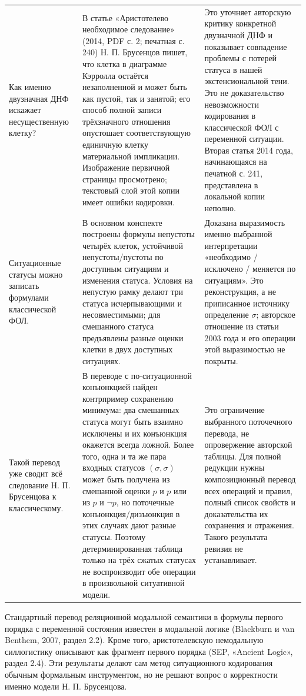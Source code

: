 \documentclass[12pt,a4paper]{article}
\begin{document}
\begin{longtable}{P{0.22\textwidth}P{0.36\textwidth}P{0.30\textwidth}}
Как именно двузначная ДНФ искажает несущественную клетку? & В статье «Аристотелево необходимое следование» (2014, PDF с. 2; печатная с. 240) Н. П. Брусенцов пишет, что клетка в диаграмме Кэрролла остаётся незаполненной и может быть как пустой, так и занятой; его способ полной записи трёхзначного отношения опустошает соответствующую единичную клетку материальной импликации. Изображение первичной страницы просмотрено; текстовый слой этой копии имеет ошибки кодировки. & Это уточняет авторскую критику конкретной двузначной ДНФ и показывает совпадение проблемы с потерей статуса в нашей экстенсиональной тени. Это не доказательство невозможности кодирования в классической ФОЛ с переменной ситуации. Вторая статья 2014 года, начинающаяся на печатной с. 241, представлена в локальной копии неполно. \\
Ситуационные статусы можно записать формулами классической ФОЛ. & В основном конспекте построены формулы непустоты четырёх клеток, устойчивой непустоты/пустоты по доступным ситуациям и изменения статуса. Условия на непустую рамку делают три статуса исчерпывающими и несовместимыми; для смешанного статуса предъявлены разные оценки клетки в двух доступных ситуациях. & Доказана выразимость именно выбранной интерпретации «необходимо / исключено / меняется по ситуациям». Это реконструкция, а не приписанное источнику определение \(\sigma\); авторское отношение из статьи 2003 года и его операции этой выразимостью не покрыты. \\
Такой перевод уже сводит всё следование Н. П. Брусенцова к классическому. & В переводе с по-ситуационной конъюнкцией найден контрпример сохранению минимума: два смешанных статуса могут быть взаимно исключены и их конъюнкция окажется всегда ложной. Более того, одна и та же пара входных статусов \((\sigma,\sigma)\) может быть получена из смешанной оценки \(p\) и \(p\) или из \(p\) и \(\neg p\), но поточечные конъюнкция/дизъюнкция в этих случаях дают разные статусы. Поэтому детерминированная таблица только на трёх сжатых статусах не воспроизводит обе операции в произвольной ситуативной модели. & Это ограничение выбранного поточечного перевода, не опровержение авторской таблицы. Для полной редукции нужны композиционный перевод всех операций и правил, полный список свойств и доказательства их сохранения и отражения. Такого результата ревизия не устанавливает. \\
\bottomrule
\end{longtable}

Стандартный перевод реляционной модальной семантики в формулы первого порядка с переменной состояния известен в модальной логике (Blackburn и van Benthem, 2007, раздел 2.2). Кроме того, аристотелевскую немодальную силлогистику описывают как фрагмент первого порядка (SEP, «Ancient Logic», раздел 2.4). Эти результаты делают сам метод ситуационного кодирования обычным формальным инструментом, но не решают вопрос о корректности именно модели Н. П. Брусенцова.
\end{document}
